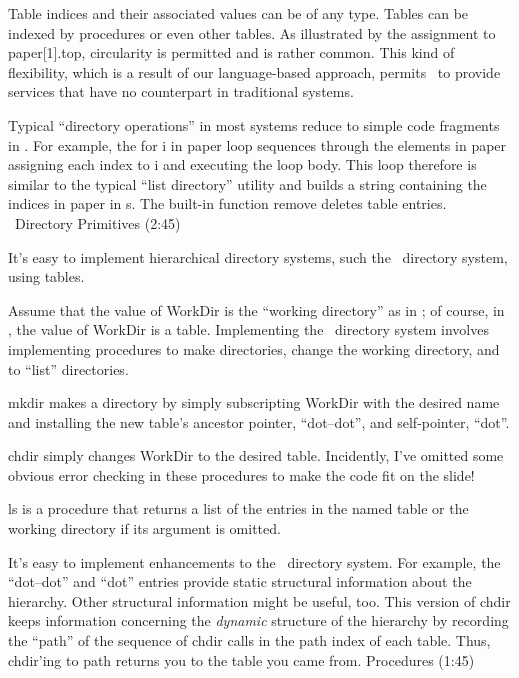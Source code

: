 Table indices and their associated values can be of any type.
Tables can be indexed by procedures or even other tables.
As illustrated by the assignment to {\pt paper[1].top},
circularity is permitted and is rather common.
This kind of flexibility, which is a result of our language-based
approach, permits \EZ\ to provide
services that have no counterpart in traditional systems.

Typical ``directory operations'' in most systems reduce
to simple code fragments in \EZ.
For example, the {\pt for i in paper} loop sequences through the elements
in {\pt paper} assigning each index to {\pt i} and executing the loop body.
This loop therefore is similar
to the typical ``list directory'' utility and
builds a string containing the indices in {\pt paper} in  {\pt s}.
The built-in function {\pt remove} deletes table entries.
\NewPage\Longtrue
\beginsection \Unix\ Directory Primitives (2:45)

It's easy to implement hierarchical directory systems,
such the \Unix\ directory system, using tables.

Assume that the value of {\pt WorkDir} is the ``working directory''
as in \Unix; of course, in \EZ, the value of {\pt WorkDir} is a table.
Implementing the \Unix\ directory system involves implementing
procedures to make directories, change the working directory,
and to ``list'' directories.

{\pt mkdir} makes a directory by simply subscripting
{\pt WorkDir} with the desired name and installing the
new table's ancestor pointer, ``dot--dot'', and self-pointer, ``dot''.

{\pt chdir} simply changes {\pt WorkDir} to the desired table.
Incidently, I've omitted some obvious error checking in these
procedures to make the code fit on the slide!

{\pt ls} is a procedure that returns a list of the
entries in the named table or the working
directory if its argument is omitted.

It's easy to implement enhancements to the \Unix\ directory system.
For example, the ``dot--dot'' and ``dot'' entries provide
static structural information about the hierarchy.
Other structural information might be useful, too.
This version of {\pt chdir} keeps information concerning
the {\sl dynamic\/} structure of the hierarchy by recording
the ``path'' of the sequence of {\pt chdir} calls in
the {\pt path} index of each table.
Thus, {\pt chdir}'ing to {\pt path} returns you to the table
you came from.
\NewPage
\beginsection Procedures (1:45)

